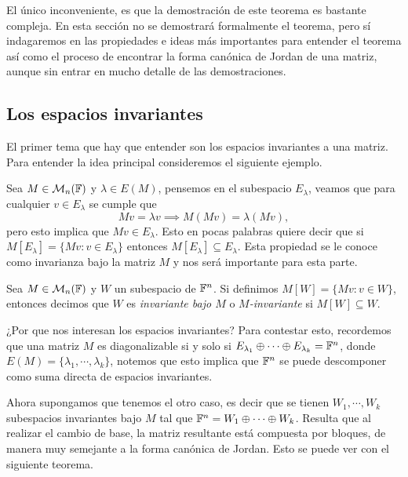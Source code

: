 El único inconveniente, es que la demostración de este teorema es bastante compleja. En esta sección no se demostrará formalmente el teorema, pero sí indagaremos en las propiedades e ideas más importantes para entender el teorema así como el proceso de encontrar la forma canónica de Jordan de una matriz, aunque sin entrar en mucho detalle de las demostraciones.



\subsection{Los espacios invariantes}

El primer tema que hay que entender son los espacios invariantes a una matriz. Para entender la idea principal consideremos el siguiente ejemplo.

Sea $M \in \mathcal{M}_n(\mathbb{F})$ y $\lambda \in E(M)$, pensemos en el subespacio $E_\lambda$, veamos que para cualquier $v \in E_\lambda$ se cumple que
\[
  Mv = \lambda v \implies M(Mv) = \lambda(Mv),
\]
pero esto implica que $Mv \in E_\lambda$. Esto en pocas palabras quiere decir que si $M[E_\lambda] = \{Mv : v \in E_\lambda\}$ entonces $M[E_\lambda] \subseteq E_\lambda$. Esta propiedad se le conoce como invarianza bajo la matriz $M$ y nos será importante para esta parte.

\begin{defi}
  Sea $M \in \mathcal{M}_n(\mathbb{F})$ y $W$ un subespacio de $\mathbb{F}^n$. Si definimos $M[W] = \{Mv : v \in W\}$, entonces decimos que $W$ es \emph{invariante bajo $M$} o \emph{$M$-invariante} si $M[W] \subseteq W$.
\end{defi}

¿Por que nos interesan los espacios invariantes? Para contestar esto, recordemos que una matriz $M$ es diagonalizable si y solo si $ E_{\lambda_1} \oplus \cdots \oplus E_{\lambda_k} = \mathbb{F}^n$, donde $E(M) = \{\lambda_1, \cdots, \lambda_k\}$, notemos que esto implica que $\mathbb{F}^n$ se puede descomponer como suma directa de espacios invariantes.

Ahora supongamos que tenemos el otro caso, es decir que se tienen $W_1, \cdots, W_k$ subespacios invariantes bajo $M$ tal que $\mathbb{F}^n = W_1 \oplus \cdots \oplus W_k$. Resulta que al realizar el cambio de base, la matriz resultante está compuesta por bloques, de manera muy semejante a la forma canónica de Jordan. Esto se puede ver con el siguiente teorema.

